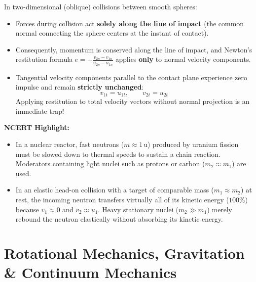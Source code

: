 \documentclass[10pt,twoside,openright]{book}
\begin{document}
\begin{trapbox}
In two-dimensional (oblique) collisions between smooth spheres:
\begin{itemize}
  \item Forces during collision act \textbf{solely along the line of impact} (the common normal connecting the sphere centers at the instant of contact).
  \item Consequently, momentum is conserved along the line of impact, and Newton's restitution formula $e = -\frac{v_{2n} - v_{1n}}{u_{2n} - u_{1n}}$ applies \textbf{only} to normal velocity components.
  \item Tangential velocity components parallel to the contact plane experience zero impulse and remain \textbf{strictly unchanged}:
  \begin{equation}
    v_{1t} = u_{1t}, \qquad v_{2t} = u_{2t}
  \end{equation}
  Applying restitution to total velocity vectors without normal projection is an immediate trap!
\end{itemize}
\end{trapbox}

\begin{ncertbox}
\textbf{NCERT Highlight:}
\begin{itemize}
  \item In a nuclear reactor, fast neutrons ($m \approx 1\,\mathrm{u}$) produced by uranium fission must be slowed down to thermal speeds to sustain a chain reaction. Moderators containing light nuclei such as protons or carbon ($m_2 \approx m_1$) are used.
  \item In an elastic head-on collision with a target of comparable mass ($m_1 \approx m_2$) at rest, the incoming neutron transfers virtually all of its kinetic energy ($100\%$) because $v_1 \approx 0$ and $v_2 \approx u_1$. Heavy stationary nuclei ($m_2 \gg m_1$) merely rebound the neutron elastically without absorbing its kinetic energy.
\end{itemize}
\end{ncertbox}

\part{Rotational Mechanics, Gravitation \& Continuum Mechanics}
\end{document}
